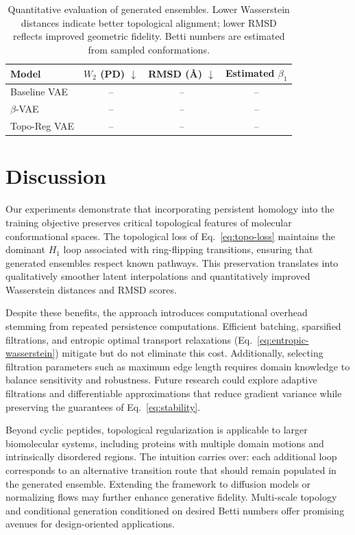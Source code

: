 \documentclass[11pt]{article}
\begin{document}
\begin{table}[t]
    \centering
    \caption{Quantitative evaluation of generated ensembles. Lower Wasserstein distances indicate better topological alignment; lower RMSD reflects improved geometric fidelity. Betti numbers are estimated from sampled conformations.}
    \label{tab:results}
    \begin{tabular}{lccc}
        \toprule
        Model & $W_2$ (PD) $\downarrow$ & RMSD (\AA) $\downarrow$ & Estimated $\beta_1$ \\
        \midrule
        Baseline VAE & -- & -- & -- \\
        $\beta$-VAE & -- & -- & -- \\
        Topo-Reg VAE & -- & -- & -- \\
        \bottomrule
    \end{tabular}
\end{table}

\section{Discussion}
Our experiments demonstrate that incorporating persistent homology into the training objective preserves critical topological features of molecular conformational spaces. The topological loss of Eq.~\eqref{eq:topo-loss} maintains the dominant $H_1$ loop associated with ring-flipping transitions, ensuring that generated ensembles respect known pathways. This preservation translates into qualitatively smoother latent interpolations and quantitatively improved Wasserstein distances and RMSD scores.

Despite these benefits, the approach introduces computational overhead stemming from repeated persistence computations. Efficient batching, sparsified filtrations, and entropic optimal transport relaxations (Eq.~\eqref{eq:entropic-wasserstein}) mitigate but do not eliminate this cost. Additionally, selecting filtration parameters such as maximum edge length requires domain knowledge to balance sensitivity and robustness. Future research could explore adaptive filtrations and differentiable approximations that reduce gradient variance while preserving the guarantees of Eq.~\eqref{eq:stability}.

Beyond cyclic peptides, topological regularization is applicable to larger biomolecular systems, including proteins with multiple domain motions and intrinsically disordered regions. The intuition carries over: each additional loop corresponds to an alternative transition route that should remain populated in the generated ensemble. Extending the framework to diffusion models or normalizing flows may further enhance generative fidelity. Multi-scale topology and conditional generation conditioned on desired Betti numbers offer promising avenues for design-oriented applications.
\end{document}
